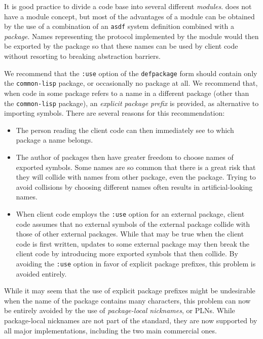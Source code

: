 It is good practice to divide a code base into several different
\emph{modules}.  \commonlisp{} does not have a module concept, but
most of the advantages of a module can be obtained by the use of a
combination of an \texttt{asdf} system definition combined with a
\commonlisp{} \emph{package}.  Names representing the protocol
implemented by the module would then be exported by the package so
that these names can be used by client code without resorting to
breaking abstraction barriers.

We recommend that the \texttt{:use} option of the \texttt{defpackage}
form should contain only the \texttt{common-lisp} package, or
occasionally no package at all.  We recommend that, when code in some
package refers to a name in a different package (other than the
\texttt{common-lisp} package), an \emph{explicit package prefix} is
provided, as alternative to importing symbols.  There are several
reasons for this recommendation:

\begin{itemize}
\item The person reading the client code can then immediately see to
  which package a name belongs.
\item The author of packages then have greater freedom to choose names
  of exported symbols.  Some names are so common that there is a great
  risk that they will collide with names from other package, even the
  \commonlisp{} package.  Trying to avoid collisions by choosing
  different names often results in artificial-looking names.
\item When client code employs the \texttt{:use} option for an
  external package, client code assumes that no external symbols of
  the external package collide with those of other external packages.
  While that may be true when the client code is first written,
  updates to some external package may then break the client code by
  introducing more exported symbols that then collide.  By avoiding
  the \texttt{:use} option in favor of explicit package prefixes, this
  problem is avoided entirely.
\end{itemize}

While  it may seem that the use of explicit package prefixes might be
undesirable when the name of the package contains many characters,
this problem can now be entirely avoided by the use of
\emph{package-local nicknames}, or PLNs.  While package-local
nicknames are not part of the \commonlisp{} standard, they are now
supported by all major \commonlisp{} implementations, including the
two main commercial ones.

